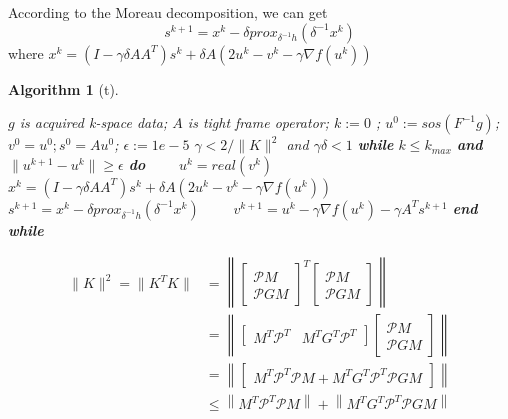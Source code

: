 \documentclass[UTF8]{article}
\newtheorem{algorithm}{Algorithm}
\renewcommand{\le}{\leqslant}
\renewcommand{\ge}{\geqslant}
\renewcommand{\le}{\leqslant}
\renewcommand{\ge}{\geqslant}
\begin{document}
According to the Moreau decomposition, we can get 
\begin{equation}
	s^{k+1} = x^k - \delta prox_{\delta^{-1} h} (\delta^{-1} x^k)
\end{equation}
where $x^k = (I-\gamma \delta AA^T)s^k + \delta A(2u^k-v^k-\gamma \nabla f(u^k))$
\begin{algorithm}[t]
	\caption{\textbf{Double Domain Reconstruction Algorithm}}
	\label{Alg:scanMatching}
	\begin{algorithmic}[1]
		\Require 
		$g$ is acquired k-space data; $A$ is tight frame operator;
		$k:= 0$ ; $u^0:= sos(F^{-1}g)$; $v^0 = u^0; s^0 = Au^0$; $\epsilon:=1e-5$
		\Ensure $\gamma < 2/ \|K\|^2$ and $\gamma \delta < 1$
		\State \textbf{while}  $k \leq k_{max}$ \textbf{and} $\|u^{k+1} - u^{k}\| \ge \epsilon$ \textbf{do}  
		\State \ \ \ \ $u^{k} = real(v^{k})$
		\State \ \ \ \ $x^k = (I-\gamma \delta AA^T)s^k + \delta A(2u^k-v^k-\gamma \nabla f(u^k))$
		\State \ \ \ \ $s^{k+1} = x^k - \delta prox_{\delta^{-1} h} (\delta^{-1} x^k)$
		\State \ \ \ \ $ v^{k+1} = u^k-\gamma \nabla f(u^k) - \gamma A^T s^{k+1}$		
		\State \textbf{end while} 
	\end{algorithmic}
\end{algorithm}
\begin{equation*}
	\begin{aligned}
	\|K\|^2 = \| K^T K\| &= \left \| 
	\begin{bmatrix}
		\mathcal{P} M \\
		\mathcal{P} GM
	\end{bmatrix}^T
	\begin{bmatrix}
		\mathcal{P} M \\
		\mathcal{P} GM
	\end{bmatrix} \right\| \\
		 & =\left\| 
		 \begin{bmatrix}
			  M^T\mathcal{P}^T &
			  M^T G^T\mathcal{P}^T
		 \end{bmatrix} 
	 	\begin{bmatrix}
	 		\mathcal{P} M \\
	 		\mathcal{P} GM
	 	\end{bmatrix}
		\right\| \\
		& = \left\|
		\begin{bmatrix}
			M^T \mathcal{P}^T \mathcal{P}M + M^T G^T\mathcal{P}^T \mathcal{P}GM
		\end{bmatrix}
		\right\| \\
		&\le  
		\left \|
			M^T \mathcal{P}^T \mathcal{P}M 
		\right\|
		+
		\left \|
			M^T G^T\mathcal{P}^T \mathcal{P}GM 
		\right\|
	\end{aligned}
\end{equation*}
\end{document}
